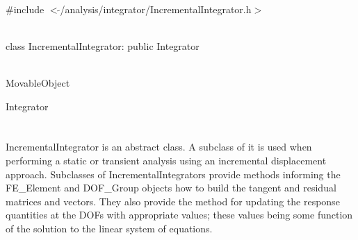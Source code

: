
   \\
\#include $<\tilde{ }$/analysis/integrator/IncrementalIntegrator.h$>$  


  \\
class IncrementalIntegrator: public Integrator  


 \\
MovableObject 

\indent\indent Integrator \\
\indent\indent{} \\

 \\ 
\indent IncrementalIntegrator is an abstract class. A subclass of it
is used when performing a static or transient analysis using an
incremental displacement approach. Subclasses of
IncrementalIntegrators provide methods informing the FE\_Element and
DOF\_Group objects how to build the tangent and residual matrices and
vectors. They also provide the method for updating the response
quantities at the DOFs with appropriate values; these values being
some function of the solution to the linear system of equations. \\ 

